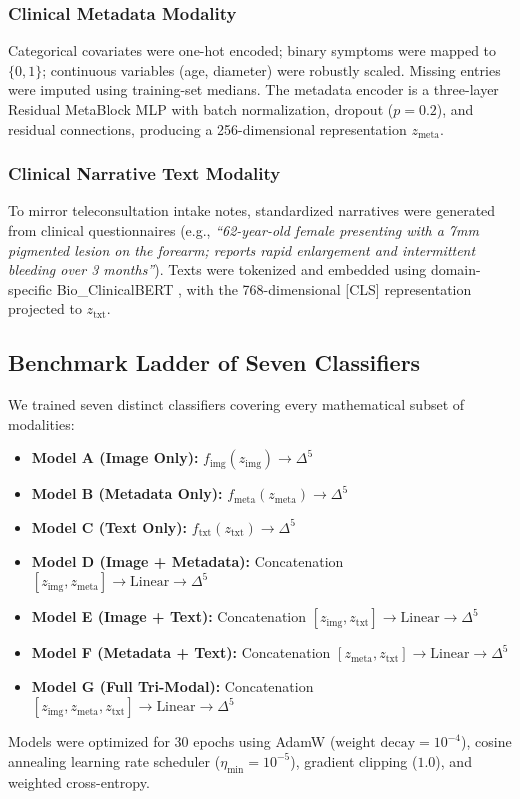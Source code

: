 \documentclass[conference]{IEEEtran}
\begin{document}
\subsubsection{Clinical Metadata Modality}
Categorical covariates were one-hot encoded; binary symptoms were mapped to $\{0, 1\}$; continuous variables (age, diameter) were robustly scaled. Missing entries were imputed using training-set medians. The metadata encoder is a three-layer Residual MetaBlock MLP with batch normalization, dropout ($p=0.2$), and residual connections, producing a 256-dimensional representation $z_{\text{meta}}$.

\subsubsection{Clinical Narrative Text Modality}
To mirror teleconsultation intake notes, standardized narratives were generated from clinical questionnaires (e.g., \textit{``62-year-old female presenting with a 7mm pigmented lesion on the forearm; reports rapid enlargement and intermittent bleeding over 3 months''}). Texts were tokenized and embedded using domain-specific Bio\_ClinicalBERT \cite{alsentzer2019publicly}, with the 768-dimensional [CLS] representation projected to $z_{\text{txt}}$.

\subsection{Benchmark Ladder of Seven Classifiers}
We trained seven distinct classifiers covering every mathematical subset of modalities:
\begin{itemize}
    \item \textbf{Model A (Image Only):} $f_{\text{img}}(z_{\text{img}}) \to \Delta^5$
    \item \textbf{Model B (Metadata Only):} $f_{\text{meta}}(z_{\text{meta}}) \to \Delta^5$
    \item \textbf{Model C (Text Only):} $f_{\text{txt}}(z_{\text{txt}}) \to \Delta^5$
    \item \textbf{Model D (Image + Metadata):} Concatenation $[z_{\text{img}}, z_{\text{meta}}] \to \text{Linear} \to \Delta^5$
    \item \textbf{Model E (Image + Text):} Concatenation $[z_{\text{img}}, z_{\text{txt}}] \to \text{Linear} \to \Delta^5$
    \item \textbf{Model F (Metadata + Text):} Concatenation $[z_{\text{meta}}, z_{\text{txt}}] \to \text{Linear} \to \Delta^5$
    \item \textbf{Model G (Full Tri-Modal):} Concatenation $[z_{\text{img}}, z_{\text{meta}}, z_{\text{txt}}] \to \text{Linear} \to \Delta^5$
\end{itemize}
Models were optimized for 30 epochs using AdamW ($\text{weight decay} = 10^{-4}$), cosine annealing learning rate scheduler ($\eta_{\min} = 10^{-5}$), gradient clipping ($1.0$), and weighted cross-entropy.
\end{document}
